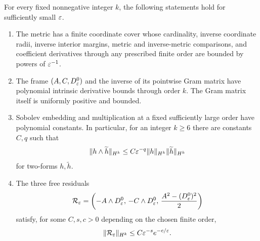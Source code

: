 \begin{lemma}
\label{lem:auxiliary-geometry}
For every fixed nonnegative integer $k$, the following statements hold
for sufficiently small $\varepsilon$.
\begin{enumerate}[label=\textup{(\roman*)}]
\item
The metric has a finite coordinate cover whose cardinality, inverse
coordinate radii, inverse interior margins, metric and inverse-metric
comparisons, and coefficient derivatives through any prescribed finite
order are bounded by powers of $\varepsilon^{-1}$.
\item
The frame $(A,C,D^0_\varepsilon)$ and the inverse of its pointwise Gram matrix
have polynomial intrinsic derivative bounds through order $k$.  The
Gram matrix itself is uniformly positive and bounded.
\item
Sobolev embedding and multiplication at a fixed sufficiently large
order have polynomial constants.  In particular, for an integer
$k\ge6$ there are constants $C,q$ such that
\begin{equation}
  \|h\wedge \widetilde h\|_{H^k}
   \le C\varepsilon^{-q}\|h\|_{H^k}\|\widetilde h\|_{H^k}
  \label{eq:auxiliary-product}
\end{equation}
for two-forms $h,\widetilde h$.
\item
The three free residuals
\begin{equation}
  \mathcal R_\varepsilon=
   \left(-A\wedge D^0_\varepsilon,\,
         -C\wedge D^0_\varepsilon,\,
         \frac{A^2-(D^0_\varepsilon)^2}{2}\right)
  \label{eq:auxiliary-residual}
\end{equation}
satisfy, for some $C,s,c>0$ depending on the chosen finite order,
\begin{equation}
  \|\mathcal R_\varepsilon\|_{H^k}
      \le C\varepsilon^{-s}e^{-c/\varepsilon}.
  \label{eq:auxiliary-residual-estimate}
\end{equation}
\end{enumerate}
\end{lemma}

